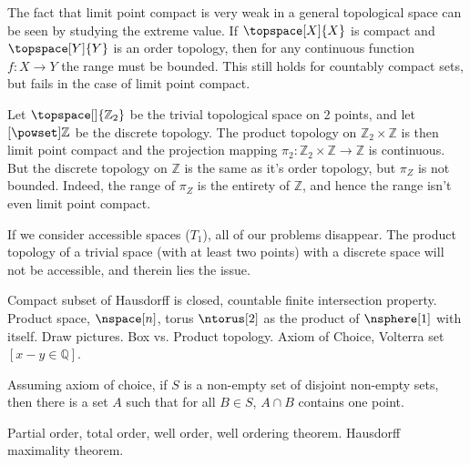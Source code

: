 \documentclass{article}                                                        %
\begin{document}
        The fact that limit point compact is very weak in a general topological
        space can be seen by studying the extreme value. If
        $\topspace[X]{X}$ is compact and $\topspace[Y]{Y}$ is an order topology,
        then for any continuous function $f:X\rightarrow{Y}$ the range must be
        bounded. This still holds for countably compact sets, but fails in the
        case of limit point compact.
        \begin{example}
            Let $\topspace[\empty]{\mathbb{Z}_{2}}$ be the trivial topological
            space on 2 points, and let $\mathcal[\powset]{\mathbb{Z}}$ be the
            discrete topology. The product topology on
            $\mathbb{Z}_{2}\times\mathbb{Z}$ is then limit point compact and the
            projection mapping
            $\pi_{2}:\mathbb{Z}_{2}\times\mathbb{Z}\rightarrow\mathbb{Z}$ is
            continuous. But the discrete topology on $\mathbb{Z}$ is the same as
            it's order topology, but $\pi_{Z}$ is not bounded. Indeed, the range
            of $\pi_{Z}$ is the entirety of $\mathbb{Z}$, and hence the range
            isn't even limit point compact.
        \end{example}
        If we consider accessible spaces ($T_{1}$), all of our problems
        disappear. The product topology of a trivial space (with at least two
        points) with a discrete space will not be accessible, and therein lies
        the issue.
        \par\hfill\par
        Compact subset of Hausdorff is closed, countable finite intersection
        property. Product space, $\nspace[n]$, torus $\ntorus[2]$ as the product
        of $\nsphere[1]$ with itself. Draw pictures. Box vs. Product topology.
        Axiom of Choice, Volterra set $[x-y\in\mathbb{Q}]$.
        \begin{theorem}
            Assuming axiom of choice, if $S$ is a non-empty set of disjoint
            non-empty sets, then there is a set $A$ such that for all
            $B\in{S}$, $A\cap{B}$ contains one point.
        \end{theorem}
        Partial order, total order, well order, well ordering theorem. Hausdorff
        maximality theorem.
\end{document}
